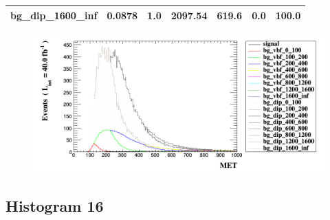 \documentclass[a4paper, 10pt]{article}
\begin{document}
\begin{table}[H]
\begin{center}
\begin{tabular}{|m{23.0mm}|m{23.0mm}|m{18.0mm}|m{19.0mm}|m{19.0mm}|m{19.0mm}|m{19.0mm}|}
      \hline
      {\cellcolor{white}         bg\_dip\_1600\_inf}& {\cellcolor{white}         0.0878}& {\cellcolor{white}         1.0}& {\cellcolor{white}         2097.54}& {\cellcolor{white}         619.6}& {\cellcolor{red}         0.0}& {\cellcolor{red}         100.0}\\
\hline
    \end{tabular}
  \end{center}
\end{table}

\begin{figure}[H]
  \begin{center}
    \includegraphics[scale=0.45]{selection_14.png}\\
\caption{   }
  \end{center}
\end{figure}
      \newpage
\subsection{ Histogram 16}
\end{document}
